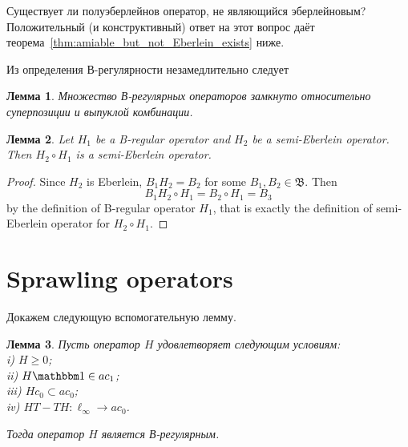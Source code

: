 \documentclass[a4paper,14pt]{article} %
\newcommand{\N}{\ensuremath{\mathbb{N}}}
\newcommand{\B}{\ensuremath{\mathfrak{B}}}
\newcommand{\one}{\ensuremath{\mathbbm 1}}
\theoremstyle{plain}
\newtheorem{lemma}{Лемма}[section]
\begin{document}
Существует ли полуэберлейнов оператор, не являющийся эберлейновым?
Положительный (и конструктивный) ответ на этот вопрос даёт теорема~\ref{thm:amiable_but_not_Eberlein_exists} ниже.



Из определения В-регулярности незамедлительно следует

\begin{lemma}
	\label{lem:B-regular_superposition_and_addition}
	Множество В-регулярных операторов замкнуто относительно суперпозиции и выпуклой комбинации.
\end{lemma}

\begin{lemma}
	Let $H_1$ be a B-regular operator and $H_2$ be a semi-Eberlein operator.
	Then $H_2 \circ H_1$ is a semi-Eberlein operator.
\end{lemma}
\begin{proof}
	Since $H_2$ is Eberlein, $B_1H_2 = B_2$ for some $B_1,B_2\in\B$.
	Then
	\begin{equation}
		B_1 H_2 \circ H_1 = B_2 \circ H_1 = B_3
	\end{equation}
	by the definition of B-regular operator $H_1$,
	that is exactly the definition of semi-Eberlein operator for $H_2 \circ H_1$.
\end{proof}

\section{Sprawling operators}



	Докажем следующую вспомогательную лемму.

	\begin{lemma}
		\label{lem:suff_B_reg}
		Пусть оператор $H$ удовлетворяет следующим условиям:
		\\i)   $H \geq 0$;
		\\ii)  $H\one\in ac_1$;
		\\iii) $H c_0 \subset ac_0$;
		\\iv)  $HT-TH : \ell_\infty \to ac_0$.%

		Тогда оператор $H$ является В-регулярным.
	\end{lemma}
\end{document}
